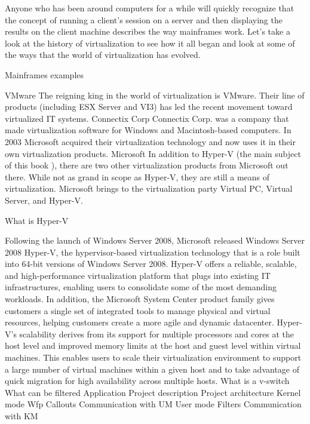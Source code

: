 \documentclass[a4paper,12pt]{report}
\begin{document}
Anyone who has been around computers for a while will quickly recognize that the concept of running a client’s session on a server and then displaying the results on the client
machine describes the way mainframes work. 
Let’s take a look at the history of virtualization to see how it all began and look at some of the ways that the world of virtualization has evolved. 

Mainframes examples

VMware
The reigning king in the world of virtualization is VMware. Their line of products
(including ESX Server and VI3) has led the recent movement toward virtualized IT systems.
Connectix Corp
Connectix Corp. was a company that made virtualization software for Windows and
Macintosh-based computers. In 2003 Microsoft acquired their virtualization technology
and now uses it in their own virtualization products.
Microsoft
In addition to Hyper-V (the main subject of this book ), there are two other virtualization products from Microsoft out there. While not as grand in scope as Hyper-V, they are still a means of virtualization. Microsoft brings to the virtualization party Virtual PC, Virtual Server, and Hyper-V. 


What is Hyper-V

Following the launch of Windows Server 2008, Microsoft released Windows Server 2008
Hyper-V, the hypervisor-based virtualization technology that is a role built into 64-bit
versions of Windows Server 2008.
Hyper-V offers a reliable, scalable, and high-performance virtualization platform that plugs into existing IT infrastructures, enabling users to consolidate some of the most demanding workloads. In addition, the Microsoft System Center product family gives customers a single set of integrated tools to manage physical and virtual resources, helping customers create a more agile and dynamic datacenter.
Hyper-V’s scalability derives from its support for multiple processors and cores at the host level and improved memory limits at the host and guest level within virtual machines. This enables users to scale their virtualization environment to support a large number of virtual machines within a given host and to take advantage of quick migration for high availability across multiple hosts.
What is a v-switch
What can be filtered
Application
Project description
Project architecture
Kernel mode
Wfp Callouts
Communication with UM
User mode
Filters
Communication with KM
\end{document}
